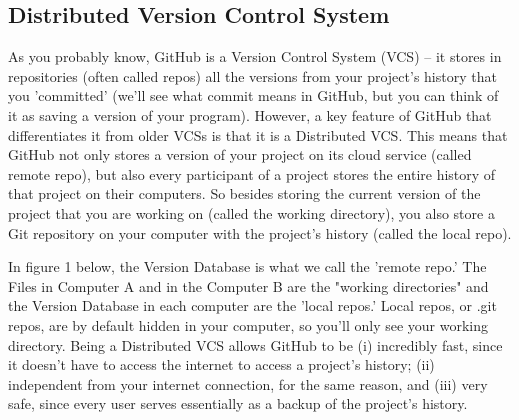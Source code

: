 \documentclass[12pt]{article}
\begin{document}
\subsection{Distributed Version Control System}
	As you probably know, GitHub is a Version Control System (VCS) -- it stores in repositories (often called repos) all the versions from your project's history that you 'committed' (we'll see what commit means in GitHub, but you can think of it as saving a version of your program). However, a key feature of GitHub that differentiates it from older VCSs is that it is a Distributed VCS. This means that GitHub not only stores a version of your project on its cloud service (called remote repo), but also every participant of a project stores the entire history of that project on their computers. So besides storing the current version of the project that you are working on (called the working directory), you also store a Git repository on your computer with the project's history (called the local repo). 

	In figure 1 below, the Version Database is what we call the 'remote repo.' The Files in Computer A and in the Computer B are the "working directories" and the Version Database in each computer are the 'local repos.' Local repos, or .git repos, are by default hidden in your computer, so you'll only see your working directory. Being a Distributed VCS allows GitHub to be (i) incredibly fast, since it doesn't have to access the internet to access a project's history; (ii) independent from your internet connection, for the same reason, and (iii) very safe, since every user serves essentially as a backup of the project's history.
	\vspace{0.3 in}
	
\end{document}
